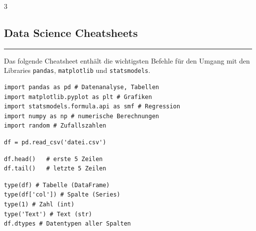 \begin{landscape}
	\footnotesize
	\begin{multicols*}{3}
		\textcolor{\cheatSheetColor}{
			\begin{centering}
				\section*{Data Science Cheatsheets}
			\end{centering}
			\hrule
			Das folgende Cheatsheet enthält die wichtigsten Befehle für den Umgang mit den Libraries \texttt{pandas}, \texttt{matplotlib} und \texttt{statsmodels}.
			\vspace{0.5em}
		}
		\begin{cheatSheetBox}[title=Libraries Importieren]
			\begin{lstlisting}
import pandas as pd # Datenanalyse, Tabellen
import matplotlib.pyplot as plt # Grafiken
import statsmodels.formula.api as smf # Regression
import numpy as np # numerische Berechnungen
import random # Zufallszahlen
\end{lstlisting}
		\end{cheatSheetBox}

		\begin{cheatSheetBox}[title=CSV-Datei laden]
			\begin{lstlisting}
df = pd.read_csv('datei.csv')
\end{lstlisting}
		\end{cheatSheetBox}

		\begin{cheatSheetBox}[title=Erste/letzte Zeilen anzeigen]
			\begin{lstlisting}
df.head()   # erste 5 Zeilen
df.tail()   # letzte 5 Zeilen
\end{lstlisting}
		\end{cheatSheetBox}

		\begin{cheatSheetBox}[title=Typ einer Variable anzeigen]
			\begin{lstlisting}
type(df) # Tabelle (DataFrame)
type(df['col']) # Spalte (Series)
type(1) # Zahl (int)
type('Text') # Text (str)
df.dtypes # Datentypen aller Spalten
\end{lstlisting}
		\end{cheatSheetBox}


\end{multicols*}
\end{landscape}
